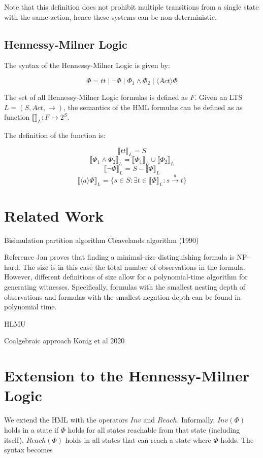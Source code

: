 \documentclass[runningheads]{llncs}
\begin{document}
Note that this definition does not prohibit multiple transitions from a single state with the same action, hence these systems can be non-deterministic.

\subsection{Hennessy-Milner Logic}
The syntax of the Hennessy-Milner Logic is given by:

$$\Phi = tt \mid \neg \Phi \mid \Phi_1 \land \Phi_2 \mid \langle Act\rangle \Phi $$

The set of all Hennessy-Milner Logic formulas is defined as $F$. Given an LTS $L = (S, Act, \rightarrow)$, the semantics of the HML formulas can be defined as as function $\llbracket \rrbracket_L : F \rightarrow 2^S$.

The definition of the function is:

    $$\llbracket tt \rrbracket_L = S$$
    $$\llbracket \Phi_1 \land \Phi_2 \rrbracket_L = \llbracket \Phi_1 \rrbracket_L \cup \llbracket \Phi_2 \rrbracket_L$$
    $$\llbracket \neg \Phi \rrbracket_L = S - \llbracket \Phi \rrbracket_L $$
    $$\llbracket \langle a \rangle \Phi \rrbracket_L = \{s \in S : \exists t \in \llbracket \Phi \rrbracket_L : s \xrightarrow{a} t \} $$



\section{Related Work}
Bisimulation partition algorithm
Cleavelands algorithm (1990)


{\color{red} Reference Jan} proves that finding a minimal-size distinguishing formula is NP-hard. The size is in this case the total number of observations in the formula. However, different definitions of size allow for a polynomial-time algorithm for generating witnesses. Specifically, formulas with the smallest nesting depth of observations and formulas with the smallest negation depth can be found in polynomial time.


HLMU

Coalgebraic approach Konig et al 2020


\section{Extension to the Hennessy-Milner Logic}
We extend the HML with the operators $Inv$ and $Reach$. Informally, $Inv(\Phi)$ holds in a state if $\Phi$ holds for all states reachable from that state (including itself). $Reach(\Phi)$ holds in all states that can reach a state where $\Phi$ holds. The syntax becomes
\end{document}
